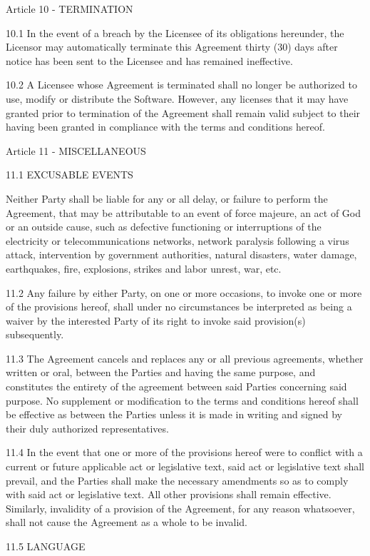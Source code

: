 \documentclass[oneside,english,onecolumn,letterpaper]{book}
\begin{document}
Article 10 - TERMINATION

10.1 In the event of a breach by the Licensee of its obligations hereunder, the Licensor may automatically terminate this Agreement thirty (30) days after notice has been sent to the Licensee and has remained ineffective.

10.2 A Licensee whose Agreement is terminated shall no longer be authorized to use, modify or distribute the Software. However, any licenses that it may have granted prior to termination of the Agreement shall remain valid subject to their having been granted in compliance with the terms and conditions hereof.

Article 11 - MISCELLANEOUS

11.1 EXCUSABLE EVENTS

Neither Party shall be liable for any or all delay, or failure to perform the Agreement, that may be attributable to an event of force majeure, an act of God or an outside cause, such as defective functioning or interruptions of the electricity or telecommunications networks, network paralysis following a virus attack, intervention by government authorities, natural disasters, water damage, earthquakes, fire, explosions, strikes and labor unrest, war, etc.

11.2 Any failure by either Party, on one or more occasions, to invoke one or more of the provisions hereof, shall under no circumstances be interpreted as being a waiver by the interested Party of its right to invoke said provision(s) subsequently.

11.3 The Agreement cancels and replaces any or all previous agreements, whether written or oral, between the Parties and having the same purpose, and constitutes the entirety of the agreement between said Parties concerning said purpose. No supplement or modification to the terms and conditions hereof shall be effective as between the Parties unless it is made in writing and signed by their duly authorized representatives.

11.4 In the event that one or more of the provisions hereof were to conflict with a current or future applicable act or legislative text, said act or legislative text shall prevail, and the Parties shall make the necessary amendments so as to comply with said act or legislative text. All other provisions shall remain effective. Similarly, invalidity of a provision of the Agreement, for any reason whatsoever, shall not cause the Agreement as a whole to be invalid.

11.5 LANGUAGE
\end{document}
